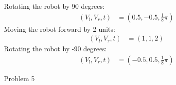 \documentclass[answers]{exam}
\begin{document}
\begin{questions}
\begin{parts}
\begin{solution}
            Rotating the robot by 90 degrees:
            \begin{align*}
                (V_l, V_r, t) & = (0.5, -0.5, \frac{1}{8} \pi)
            \end{align*}
            Moving the robot forward by 2 units:
            \begin{align*}
                (V_l, V_r, t) & = (1, 1, 2)
            \end{align*}
            Rotating the robot by -90 degrees:
            \begin{align*}
                (V_l, V_r, t) & = (-0.5, 0.5, \frac{1}{8} \pi)
            \end{align*}
        \end{solution}
    \end{parts}
    \question Problem 5
\end{questions}
\end{document}
